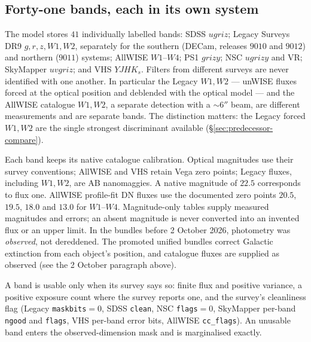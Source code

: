 \documentclass[11pt,a4paper]{article}
\begin{document}
\subsection{Forty-one bands, each in its own system}
\label{sec:bands}

The model stores $41$ individually labelled bands: SDSS $ugriz$; Legacy
Surveys DR9 $g,r,z,W1,W2$, separately for the southern (DECam, releases
$9010$ and $9012$) and northern ($9011$) systems; AllWISE $W1$--$W4$; PS1
$grizy$; NSC $ugrizy$ and VR; SkyMapper $uvgriz$; and VHS $YJHK_s$. Filters
from different surveys are never identified with one another. In particular
the Legacy $W1,W2$ --- unWISE fluxes forced at the optical position and
deblended with the optical model --- and the AllWISE catalogue $W1,W2$, a
separate detection with a $\sim6''$ beam, are different measurements and are
separate bands. The distinction matters: the Legacy forced $W1,W2$ are the
single strongest discriminant available (\S\ref{sec:predecessor-compare}).

Each band keeps its native catalogue calibration. Optical magnitudes use their
survey conventions; AllWISE and VHS retain Vega zero points; Legacy fluxes,
including $W1,W2$, are AB nanomaggies. A native magnitude of $22.5$ corresponds
to flux one. AllWISE profile-fit DN fluxes use the documented zero points
$20.5$, $19.5$, $18.0$ and $13.0$ for $W1$--$W4$. Magnitude-only tables supply
measured magnitudes and errors; an absent magnitude is never converted into an
invented flux or an upper limit. In the bundles before 2 October 2026, photometry
was \emph{observed}, not dereddened. The promoted unified bundles correct Galactic
extinction from each object's position, and catalogue fluxes are supplied as observed
(see the 2 October paragraph above).

A band is usable only when its survey says so: finite flux and positive
variance, a positive exposure count where the survey reports one, and the
survey's cleanliness flag (Legacy \texttt{maskbits}$=0$, SDSS \texttt{clean},
NSC \texttt{flags}$=0$, SkyMapper per-band \texttt{ngood} and \texttt{flags},
VHS per-band error bits, AllWISE \texttt{cc\_flags}). An unusable band enters
the observed-dimension mask and is marginalised exactly.
\end{document}
